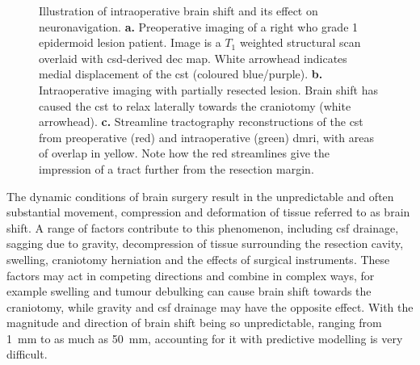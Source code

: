 \begin{SCfigure}[][Hp!]
  
  \caption{Illustration of intraoperative brain shift and its effect on neuronavigation.
  \textbf{\sffamily a.} Preoperative imaging of a right \gls{who} grade 1 epidermoid lesion patient. Image is a $T_1$ weighted structural scan overlaid with \gls{csd}-derived \gls{dec} map. White arrowhead indicates medial displacement of the \gls{cst} (coloured blue/purple).
  \textbf{\sffamily b.} Intraoperative imaging with partially resected lesion. Brain shift has caused the \gls{cst} to relax laterally towards the craniotomy (white arrowhead).
  \textbf{\sffamily c.} Streamline tractography reconstructions of the \gls{cst} from preoperative (red) and intraoperative (green) \gls{dmri}, with areas of overlap in yellow. Note how the red streamlines give the impression of a tract further from the resection margin.}
  \label{fig:shift}
\end{SCfigure}

The dynamic conditions of brain surgery result in the unpredictable and often substantial movement, compression and deformation of tissue referred to as brain shift.
A range of factors contribute to this phenomenon, including \gls{csf} drainage, sagging due to gravity, decompression of tissue surrounding the resection cavity, swelling, craniotomy herniation and the effects of surgical instruments\autocite{Gerard2017}.
These factors may act in competing directions and combine in complex ways, for example swelling and tumour debulking can cause brain shift towards the craniotomy, while gravity and \gls{csf} drainage may have the opposite effect\autocite{Roberts1998}.
With the magnitude and direction of brain shift being so unpredictable, ranging from 1~mm to as much as 50~mm\autocite{Gerard2017}, accounting for it with predictive modelling is very difficult\autocite{Bayer2017b}.

